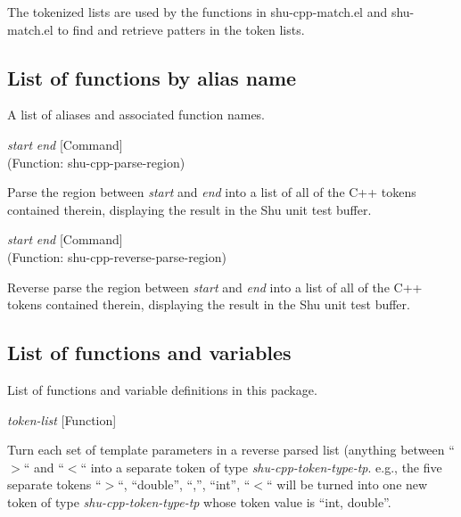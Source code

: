 The tokenized lists are used by the functions in shu-cpp-match.el and
shu-match.el to find and retrieve patters in the token lists.


\subsection{List of functions by alias name}

A list of aliases and associated function names.



\vspace{1em}
\noindent
{}
\usebox{\funcname}\emph{start} \emph{end}
 \hfill [Command]\\%
 (Function: shu-cpp-parse-region)

\begin{doc-string}
Parse the region between \emph{start} and \emph{end} into a list of all of the C++ tokens
contained therein, displaying the result in the Shu unit test buffer.
\end{doc-string}

\vspace{1em}
\noindent
{}
\usebox{\funcname}\emph{start} \emph{end}
 \hfill [Command]\\%
 (Function: shu-cpp-reverse-parse-region)

\begin{doc-string}
Reverse parse the region between \emph{start} and \emph{end} into a list of all of the C++
tokens contained therein, displaying the result in the Shu unit test buffer.
\end{doc-string}

\subsection{List of functions and variables}

List of functions and variable definitions in this package.



\vspace{1em}
\noindent
{}
\usebox{\funcname}\emph{token-list}
 \hfill [Function]

\begin{doc-string}
Turn each set of template parameters in a reverse parsed list (anything between
``$>$`` and ``$<$`` into a separate token of type \emph{shu-cpp-token-type-tp}.  e.g., the
five separate tokens ``$>$``, ``double'', ``,'', ``int'', ``$<$`` will be turned into
one new token of type \emph{shu-cpp-token-type-tp} whose token value is ``int, double''.
\end{doc-string}

